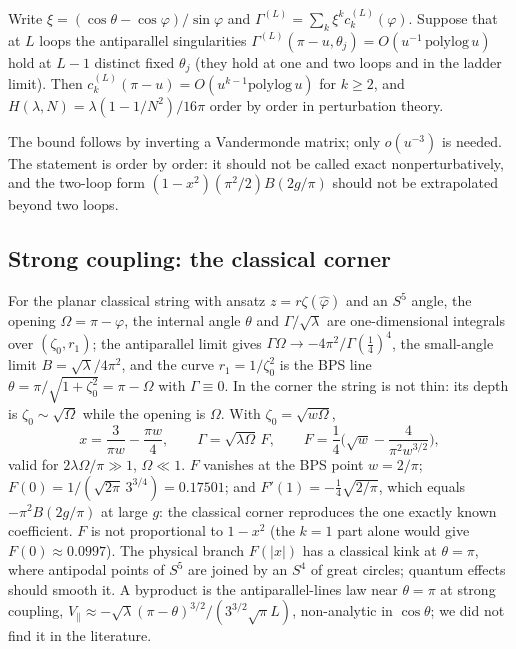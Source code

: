 \begin{proposition}
Write $\xi=(\cos\theta-\cos\varphi)/\sin\varphi$ and $\Gamma^{(L)}=\sum_k\xi^kc_k^{(L)}(\varphi)$. Suppose that at $L$
loops the antiparallel singularities $\Gamma^{(L)}(\pi-u,\theta_j)=O(u^{-1}\,\mathrm{polylog}\,u)$ hold at $L-1$
distinct fixed $\theta_j$ (they hold at one and two loops and in the ladder limit). Then $c_k^{(L)}(\pi-u)=O(u^{k-1}\mathrm{polylog}\,u)$
for $k\ge2$, and $H(\lambda,N)=\lambda(1-1/N^2)/16\pi$ order by order in perturbation theory.
\end{proposition}

The bound follows by inverting a Vandermonde matrix; only $o(u^{-3})$ is needed. The statement is order by order: it
should not be called exact nonperturbatively, and the two-loop form $(1-x^2)(\pi^2/2)B(2g/\pi)$ should not be
extrapolated beyond two loops.

\subsection{Strong coupling: the classical corner}

For the planar classical string with ansatz $z=r\zeta(\hat\varphi)$ and an $S^5$ angle, the opening $\Omega=\pi-\varphi$,
the internal angle $\theta$ and $\Gamma/\sqrt\lambda$ are one-dimensional integrals over $(\zeta_0,r_1)$; the antiparallel
limit gives $\Gamma\Omega\to-4\pi^2/\Gamma(\tfrac14)^4$, the small-angle limit $B=\sqrt\lambda/4\pi^2$, and the curve
$r_1=1/\zeta_0^2$ is the BPS line $\theta=\pi/\sqrt{1+\zeta_0^2}=\pi-\Omega$ with $\Gamma\equiv0$. In the corner the
string is not thin: its depth is $\zeta_0\sim\sqrt\Omega$ while the opening is $\Omega$. With $\zeta_0=\sqrt{w\Omega}$,
\begin{equation}
x=\frac3{\pi w}-\frac{\pi w}4,\qquad \Gamma=\sqrt{\lambda\Omega}\,F,\qquad F=\frac14\Big(\sqrt w-\frac4{\pi^2w^{3/2}}\Big),
\end{equation}
valid for $2\lambda\Omega/\pi\gg1$, $\Omega\ll1$. $F$ vanishes at the BPS point $w=2/\pi$;
$F(0)=1/(\sqrt{2\pi}\,3^{3/4})=0.17501$; and $F'(1)=-\tfrac14\sqrt{2/\pi}$, which equals $-\pi^2B(2g/\pi)$ at large $g$:
the classical corner reproduces the one exactly known coefficient. $F$ is not proportional to $1-x^2$ (the $k=1$
part alone would give $F(0)\approx0.0997$). The physical branch $F(|x|)$ has a classical kink at $\theta=\pi$, where
antipodal points of $S^5$ are joined by an $S^4$ of great circles; quantum effects should smooth it. A byproduct is
the antiparallel-lines law near $\theta=\pi$ at strong coupling, $V_\parallel\approx-\sqrt\lambda(\pi-\theta)^{3/2}/(3^{3/2}\sqrt\pi L)$,
non-analytic in $\cos\theta$; we did not find it in the literature.

